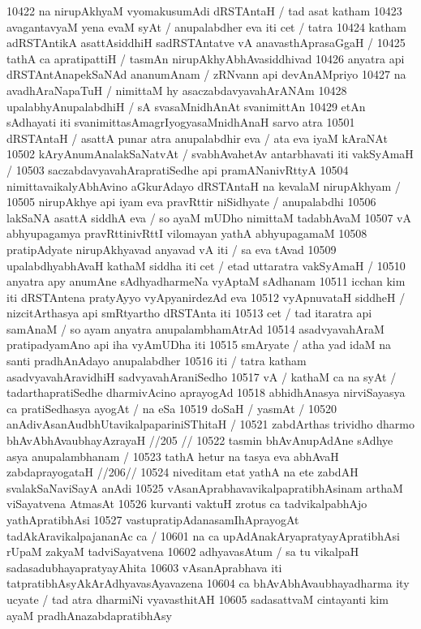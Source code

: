 10422 na nirupAkhyaM vyomakusumAdi dRSTAntaH / tad asat katham
10423 avagantavyaM yena evaM syAt / anupalabdher eva iti cet / tatra  
10424 katham adRSTAntikA asattAsiddhiH sadRSTAntatve vA anavasthAprasaGgaH /
10425 tathA ca apratipattiH / tasmAn nirupAkhyAbhAvasiddhivad  
10426 anyatra api dRSTAntAnapekSaNAd ananumAnam / zRNvann api devAnAMpriyo
10427 na avadhAraNapaTuH / nimittaM hy asaczabdavyavahArANAm 
10428 upalabhyAnupalabdhiH / sA svasaMnidhAnAt svanimittAn  
10429 etAn sAdhayati iti svanimittasAmagrIyogyasaMnidhAnaH sarvo atra  
10501 dRSTAntaH / asattA punar atra anupalabdhir eva / ata eva iyaM kAraNAt 
10502 kAryAnumAnalakSaNatvAt / svabhAvahetAv antarbhavati iti vakSyAmaH /
10503 saczabdavyavahArapratiSedhe api pramANanivRttyA  
10504 nimittavaikalyAbhAvino aGkurAdayo dRSTAntaH na kevalaM nirupAkhyam /
10505 nirupAkhye api iyam eva pravRttir niSidhyate / anupalabdhi  
10506 lakSaNA asattA siddhA eva / so ayaM mUDho nimittaM tadabhAvaM 
10507 vA abhyupagamya pravRttinivRttI vilomayan yathA abhyupagamaM 
10508 pratipAdyate nirupAkhyavad anyavad vA iti / sa eva tAvad
10509 upalabdhyabhAvaH kathaM siddha iti cet / etad uttaratra vakSyAmaH / 
10510 anyatra apy anumAne sAdhyadharmeNa vyAptaM sAdhanam
10511 icchan kim iti dRSTAntena pratyAyyo vyApyanirdezAd eva
10512 vyApnuvataH siddheH / nizcitArthasya api smRtyartho dRSTAnta iti  
10513 cet / tad itaratra api samAnaM / so ayam anyatra anupalambhamAtrAd 
10514 asadvyavahAraM pratipadyamAno api iha vyAmUDha iti 
10515 smAryate / atha yad idaM na santi pradhAnAdayo anupalabdher 
10516 iti / tatra katham asadvyavahAravidhiH sadvyavahAraniSedho 
10517 vA / kathaM ca na syAt / tadarthapratiSedhe dharmivAcino aprayogAd 
10518 abhidhAnasya nirviSayasya ca pratiSedhasya ayogAt / na eSa  
10519 doSaH / yasmAt /
10520 	anAdivAsanAudbhUtavikalpapariniSThitaH /
10521 	zabdArthas trividho dharmo bhAvAbhAvaubhayAzrayaH //205 //
10522 	tasmin bhAvAnupAdAne sAdhye asya anupalambhanam /  
10523 	tathA hetur na tasya eva abhAvaH zabdaprayogataH //206// 
10524 niveditam etat yathA na ete zabdAH svalakSaNaviSayA anAdi  
10525 vAsanAprabhavavikalpapratibhAsinam arthaM viSayatvena AtmasAt  
10526 kurvanti vaktuH zrotus ca tadvikalpabhAjo yathApratibhAsi
10527 vastupratipAdanasamIhAprayogAt tadAkAravikalpajananAc ca /
10601 na ca upAdAnakAryapratyayApratibhAsi rUpaM zakyaM tadviSayatvena
10602 adhyavasAtum / sa tu vikalpaH sadasadubhayapratyayAhita  
10603 vAsanAprabhava iti tatpratibhAsyAkArAdhyavasAyavazena
10604 ca bhAvAbhAvaubhayadharma ity ucyate / tad atra dharmiNi vyavasthitAH
10605 sadasattvaM cintayanti kim ayaM pradhAnazabdapratibhAsy
